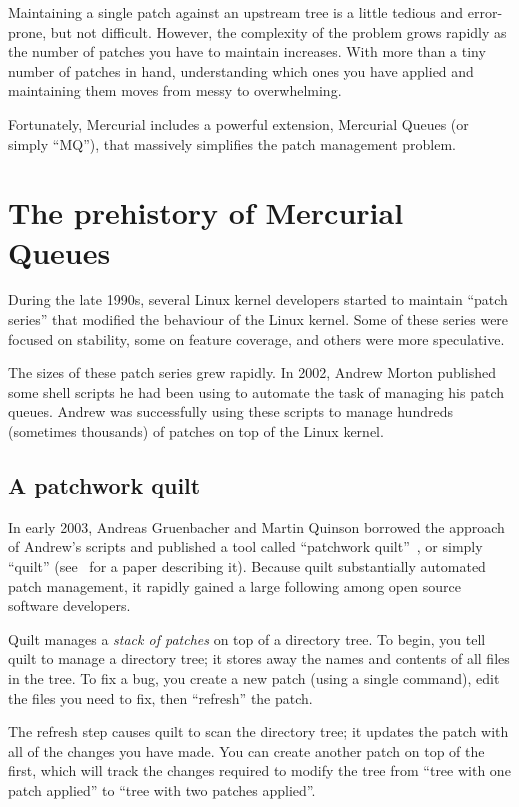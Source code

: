 Maintaining a single patch against an upstream tree is a little
tedious and error-prone, but not difficult.  However, the complexity
of the problem grows rapidly as the number of patches you have to
maintain increases.  With more than a tiny number of patches in hand,
understanding which ones you have applied and maintaining them moves
from messy to overwhelming.

Fortunately, Mercurial includes a powerful extension, Mercurial Queues
(or simply ``MQ''), that massively simplifies the patch management
problem.

\section{The prehistory of Mercurial Queues}
\label{sec:mq:history}

During the late 1990s, several Linux kernel developers started to
maintain ``patch series'' that modified the behaviour of the Linux
kernel.  Some of these series were focused on stability, some on
feature coverage, and others were more speculative.

The sizes of these patch series grew rapidly.  In 2002, Andrew Morton
published some shell scripts he had been using to automate the task of
managing his patch queues.  Andrew was successfully using these
scripts to manage hundreds (sometimes thousands) of patches on top of
the Linux kernel.

\subsection{A patchwork quilt}
\label{sec:mq:quilt}


In early 2003, Andreas Gruenbacher and Martin Quinson borrowed the
approach of Andrew's scripts and published a tool called ``patchwork
quilt''~\cite{web:quilt}, or simply ``quilt''
(see~\cite{gruenbacher:2005} for a paper describing it).  Because
quilt substantially automated patch management, it rapidly gained a
large following among open source software developers.

Quilt manages a \emph{stack of patches} on top of a directory tree.
To begin, you tell quilt to manage a directory tree; it stores away
the names and contents of all files in the tree.  To fix a bug, you
create a new patch (using a single command), edit the files you need
to fix, then ``refresh'' the patch.  

The refresh step causes quilt to scan the directory tree; it updates
the patch with all of the changes you have made.  You can create
another patch on top of the first, which will track the changes
required to modify the tree from ``tree with one patch applied'' to
``tree with two patches applied''.

